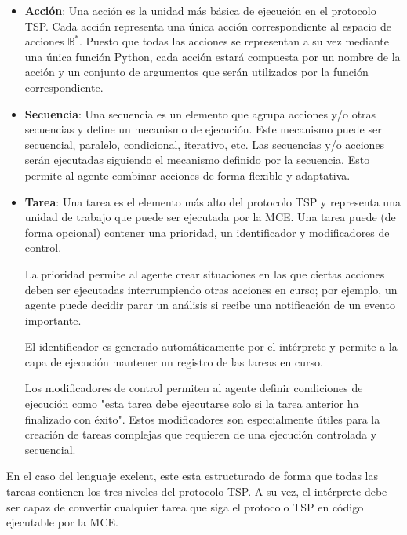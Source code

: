 \begin{itemize}

    \item \textbf{Acción}: Una acción es la unidad más básica de ejecución en
    el protocolo TSP. Cada acción representa una única acción correspondiente al
    espacio de acciones \(\mathbb{B}^*\). Puesto que todas las acciones se representan
    a su vez mediante una única función Python, cada acción estará compuesta por
    un nombre de la acción y un conjunto de argumentos que serán utilizados por la
    función correspondiente.

    \item \textbf{Secuencia}: Una secuencia es un elemento que agrupa acciones
    y/o otras secuencias y define un mecanismo de ejecución. Este mecanismo
    puede ser secuencial, paralelo, condicional, iterativo, etc. Las secuencias y/o 
    acciones serán ejecutadas siguiendo el mecanismo definido por la secuencia. Esto 
    permite al agente combinar acciones de forma flexible y adaptativa.

    \item \textbf{Tarea}: Una tarea es el elemento más alto del protocolo TSP y
    representa una unidad de trabajo que puede ser ejecutada por la MCE. Una tarea
    puede (de forma opcional) contener una prioridad, un identificador y modificadores
    de control. 
    
    La prioridad permite al agente crear situaciones en las que ciertas
    acciones deben ser ejecutadas interrumpiendo otras acciones en curso; por ejemplo,
    un agente puede decidir parar un análisis si recibe una notificación de un
    evento importante.
    
    El identificador es generado automáticamente por el intérprete y permite a
    la capa de ejecución mantener un registro de las tareas en curso. 

    Los modificadores de control permiten al agente definir condiciones de ejecución como
    "esta tarea debe ejecutarse solo si la tarea anterior ha finalizado con éxito". 
    Estos modificadores son especialmente útiles para la creación de tareas
    complejas que requieren de una ejecución controlada y secuencial.

\end{itemize}

En el caso del lenguaje exelent, este esta estructurado de forma que todas las tareas
contienen los tres niveles del protocolo TSP. A su vez, el intérprete debe ser capaz
de convertir cualquier tarea que siga el protocolo TSP en código ejecutable por la MCE.

